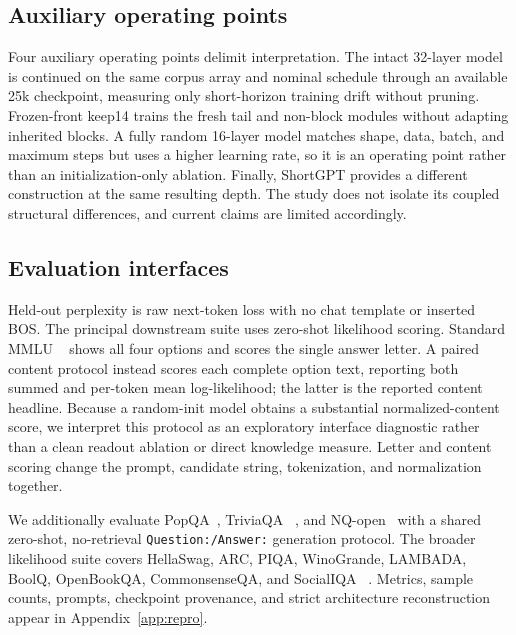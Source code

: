 \subsection{Auxiliary operating points}
Four auxiliary operating points delimit interpretation. The intact 32-layer
model is continued on the same corpus array and nominal schedule through an
available 25k checkpoint, measuring only short-horizon training drift without
pruning. Frozen-front keep14
trains the fresh tail and non-block modules without adapting inherited blocks.
A fully random 16-layer model matches shape, data, batch, and maximum steps but
uses a higher learning rate, so it is an operating point rather than an
initialization-only ablation. Finally, ShortGPT provides a different construction at the
same resulting depth. The study does not isolate its coupled structural
differences, and current claims are limited accordingly.

\subsection{Evaluation interfaces}
Held-out perplexity is raw next-token loss with no chat template or inserted BOS.
The principal downstream suite uses zero-shot likelihood scoring. Standard MMLU
~\citep{hendrycks2021mmlu} shows all four options and scores the single answer
letter. A paired content
protocol instead scores each complete option text, reporting both summed and
per-token mean log-likelihood; the latter is the reported content headline.
Because a random-init model obtains a
substantial normalized-content score, we interpret this protocol as an
exploratory interface diagnostic rather than a clean readout ablation or direct
knowledge measure. Letter and content scoring change the prompt, candidate
string, tokenization, and normalization together.

We additionally evaluate PopQA~\citep{mallen2023popqa}, TriviaQA
~\citep{joshi2017triviaqa}, and NQ-open~\citep{kwiatkowski2019natural} with a
shared zero-shot, no-retrieval \texttt{Question:/Answer:} generation protocol.
The broader likelihood suite covers HellaSwag, ARC, PIQA, WinoGrande, LAMBADA,
BoolQ, OpenBookQA, CommonsenseQA, and SocialIQA
~\citep{hellaswag,arc,piqa,winogrande,lambada,boolq,openbookqa,
commonsenseqa,socialiqa}. Metrics, sample counts, prompts, checkpoint provenance, and
strict architecture reconstruction appear in Appendix~\ref{app:repro}.
